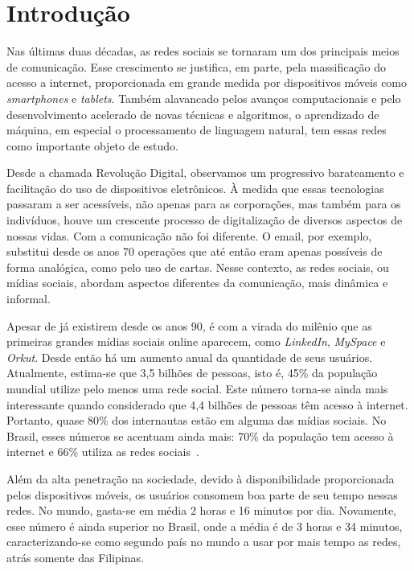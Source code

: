 \chapter{Introdução}
\label{chapter:intro}

Nas últimas duas décadas, as redes sociais se tornaram um dos principais meios de
comunicação.
Esse crescimento se justifica, em parte, pela massificação do acesso a internet,
proporcionada em grande medida por dispositivos móveis como \textit{smartphones}
e \textit{tablets}.
Também alavancado pelos avanços computacionais e pelo desenvolvimento acelerado
de novas técnicas e algoritmos, o aprendizado de máquina, em especial o
processamento de linguagem natural, tem essas redes como importante objeto de
estudo.

Desde a chamada Revolução Digital, observamos um progressivo barateamento e
facilitação do uso de dispositivos eletrônicos.
À medida que essas tecnologias passaram a ser acessíveis, não apenas para as
corporações, mas também para os indivíduos, houve um crescente processo de
digitalização de diversos aspectos de nossas vidas.
Com a comunicação não foi diferente.
O email, por exemplo, substitui desde os anos 70 operações que até então eram
apenas possíveis de forma analógica, como pelo uso de cartas.
Nesse contexto, as redes sociais, ou mídias sociais, abordam aspectos diferentes
da comunicação, mais dinâmica e informal.

Apesar de já existirem desde os anos 90, é com a virada do milênio que as
primeiras grandes mídias sociais online aparecem, como \textit{LinkedIn},
\textit{MySpace} e \textit{Orkut}.
Desde então há um aumento anual da quantidade de seus usuários.
Atualmente, estima-se que 3,5 bilhões de pessoas, isto é, 45\% da população mundial
utilize pelo menos uma rede social.
Este número torna-se ainda mais interessante quando considerado que 4,4 bilhões
de pessoas têm acesso à internet.
Portanto, quase 80\% dos internautas estão em alguma das mídias sociais.
No Brasil, esses números se acentuam ainda mais: 70\% da população tem
acesso à internet e 66\% utiliza as redes sociais~\cite{social19}.

Além da alta penetração na sociedade, devido à disponibilidade proporcionada
pelos dispositivos móveis, os usuários consomem boa parte de seu tempo nessas
redes.
No mundo, gasta-se em média 2 horas e 16 minutos por dia.
Novamente, esse número é ainda superior no Brasil, onde a média é de 3 horas e
34 minutos, caracterizando-se como segundo país no mundo a usar por mais tempo
as redes, atrás somente das Filipinas.

